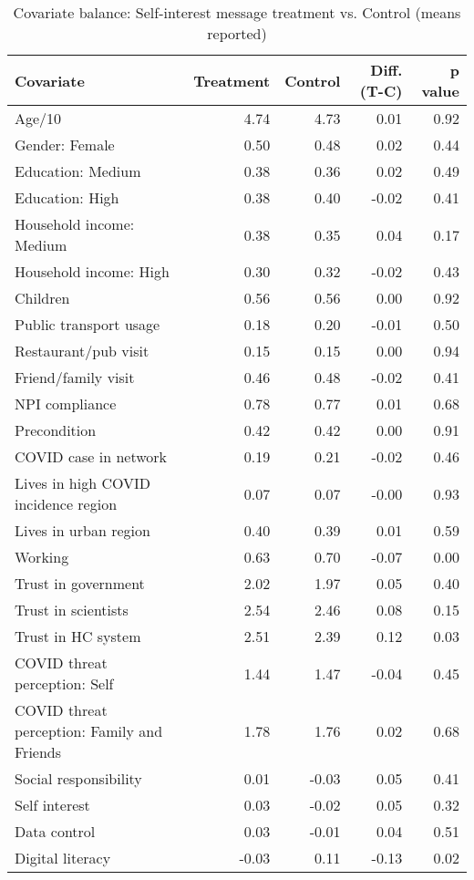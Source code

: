 \begin{table}[h!]
\centering
\caption{Covariate balance: Self-interest message treatment vs. Control (means reported)} 
\label{tab:selfint-balance}
\begingroup\footnotesize
\begin{tabular}{lrrrr}
  \hline
Covariate & Treatment & Control & Diff. (T-C) & p value \\ 
  \hline
Age/10 & 4.74 & 4.73 & 0.01 & 0.92 \\ 
  Gender: Female & 0.50 & 0.48 & 0.02 & 0.44 \\ 
  Education: Medium & 0.38 & 0.36 & 0.02 & 0.49 \\ 
  Education: High & 0.38 & 0.40 & -0.02 & 0.41 \\ 
  Household income: Medium & 0.38 & 0.35 & 0.04 & 0.17 \\ 
  Household income: High & 0.30 & 0.32 & -0.02 & 0.43 \\ 
  Children & 0.56 & 0.56 & 0.00 & 0.92 \\ 
  Public transport usage & 0.18 & 0.20 & -0.01 & 0.50 \\ 
  Restaurant/pub visit & 0.15 & 0.15 & 0.00 & 0.94 \\ 
  Friend/family visit & 0.46 & 0.48 & -0.02 & 0.41 \\ 
  NPI compliance & 0.78 & 0.77 & 0.01 & 0.68 \\ 
  Precondition & 0.42 & 0.42 & 0.00 & 0.91 \\ 
  COVID case in network & 0.19 & 0.21 & -0.02 & 0.46 \\ 
  Lives in high COVID incidence region & 0.07 & 0.07 & -0.00 & 0.93 \\ 
  Lives in urban region & 0.40 & 0.39 & 0.01 & 0.59 \\ 
  Working & 0.63 & 0.70 & -0.07 & 0.00 \\ 
  Trust in government & 2.02 & 1.97 & 0.05 & 0.40 \\ 
  Trust in scientists & 2.54 & 2.46 & 0.08 & 0.15 \\ 
  Trust in HC system & 2.51 & 2.39 & 0.12 & 0.03 \\ 
  COVID threat perception: Self & 1.44 & 1.47 & -0.04 & 0.45 \\ 
  COVID threat perception: Family and Friends & 1.78 & 1.76 & 0.02 & 0.68 \\ 
  Social responsibility & 0.01 & -0.03 & 0.05 & 0.41 \\ 
  Self interest & 0.03 & -0.02 & 0.05 & 0.32 \\ 
  Data control & 0.03 & -0.01 & 0.04 & 0.51 \\ 
  Digital literacy & -0.03 & 0.11 & -0.13 & 0.02 \\ 
   \hline
\end{tabular}
\endgroup
\end{table}
